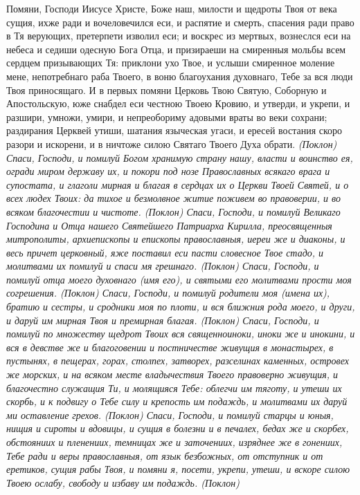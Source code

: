 \normalfont{}Помяни, Господи Иисусе Христе, Боже наш, милости и щедроты Твоя от века сущия, ихже ради и вочеловечился еси, и распятие и смерть, спасения ради право в Тя верующих, претерпети изволил еси; и воскрес из мертвых, вознеслся еси на небеса и седиши одесную Бога Отца, и призираеши на смиренныя мольбы всем сердцем призывающих Тя: приклони ухо Твое, и услыши смиренное моление мене, непотребнаго раба Твоего, в воню благоухания духовнаго, Тебе за вся люди Твоя приносящаго. И в первых помяни Церковь Твою Святую, Соборную и Апостольскую, юже снабдел еси честною Твоею Кровию, и утверди, и укрепи, и разшири, умножи, умири, и непреобориму адовыми враты во веки сохрани; раздирания Церквей утиши, шатания языческая угаси, и ересей востания скоро разори и искорени, и в ничтоже силою Святаго Твоего Духа обрати. \itshape (Поклон)\normalfont{} 
Спаси, Господи, и помилуй Богом хранимую страну нашу, власти и воинство ея, огради миром державу их, и покори под нозе Православных всякаго врага и супостата, и глаголи мирная и благая в сердцах их о Церкви Твоей Святей, и о всех людех Твоих: да тихое и безмолвное житие поживем во правоверии, и во всяком благочестии и чистоте. \itshape (Поклон)\normalfont{} 
Спаси, Господи, и помилуй Великаго Господина и Отца нашего Святейшего Патриарха Кирилла, преосвященныя митрополиты, архиепископы и епископы православныя, иереи же и диаконы, и весь причет церковный, яже поставил еси пасти словесное Твое стадо, и молитвами их помилуй и спаси мя грешнаго. \itshape (Поклон)\normalfont{} 
Спаси, Господи, и помилуй отца моего духовнаго \itshape (имя его)\normalfont{}, и святыми его молитвами прости моя согрешения. \itshape (Поклон)\normalfont{} 
Спаси, Господи, и помилуй родители моя \itshape (имена их)\normalfont{}, братию и сестры, и сродники моя по плоти, и вся ближния рода моего, и други, и даруй им мирная Твоя и премирная благая. \itshape (Поклон)\normalfont{} 
Спаси, Господи, и помилуй по множеству щедрот Твоих вся священноиноки, иноки же и инокини, и вся в девстве же и благоговении и постничестве живущия в монастырех, в пустынях, в пещерах, горах, столпех, затворех, разселинах каменных, островех же морских, и на всяком месте владычествия Твоего правоверно живущия, и благочестно служащия Ти, и молящияся Тебе: облегчи им тяготу, и утеши их скорбь, и к подвигу о Тебе силу и крепость им подаждь, и молитвами их даруй ми оставление грехов. \itshape (Поклон)\normalfont{} 
Спаси, Господи, и помилуй старцы и юныя, нищия и сироты и вдовицы, и сущия в болезни и в печалех, бедах же и скорбех, обстояниих и пленениих, темницах же и заточениих, изряднее же в гонениих, Тебе ради и веры православныя, от язык безбожных, от отступник и от еретиков, сущия рабы Твоя, и помяни я, посети, укрепи, утеши, и вскоре силою Твоею ослабу, свободу и избаву им подаждь. \itshape (Поклон) \normalfont{}
